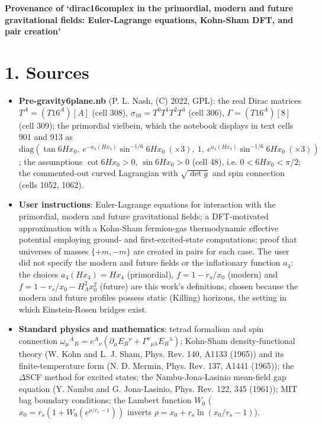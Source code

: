\documentclass[10pt]{article}
\begin{document}
{\raggedright\LARGE\bfseries Provenance of `dirac16complex in the primordial, modern and future gravitational fields: Euler-Lagrange equations, Kohn-Sham DFT, and pair creation'\par}\medskip

\section*{1. Sources}

\begin{itemize}
\item \textbf{Pre-gravity6plane.nb} (P. L. Nash, (C) 2022, GPL): the real Dirac matrices $T^A = (T16^A)[A]$ (cell 308), $\sigma_{16} = T^0T^1T^2T^3$ (cell 306), $\Gamma = (T16^A)[8]$ (cell 309); the primordial vielbein, which the notebook displays in text cells 901 and 913 as $\mathrm{diag}(\tan 6Hx_0,\ e^{-a_4(Hx_4)}\sin^{-1/6}6Hx_0\ (\times3),\ 1,\ e^{a_4(Hx_4)}\sin^{-1/6}6Hx_0\ (\times3))$; the assumptions $\cot 6Hx_0>0$, $\sin 6Hx_0>0$ (cell 48), i.e. $0 < 6Hx_0 < \pi/2$; the commented-out curved Lagrangian with $\sqrt{\det g}$ and spin connection (cells 1052, 1062).
\item \textbf{User instructions}: Euler-Lagrange equations for interaction with the primordial, modern and future gravitational fields; a DFT-motivated approximation with a Kohn-Sham fermion-gas thermodynamic effective potential employing ground- and first-excited-state computations; proof that universes of masses $\{+m,-m\}$ are created in pairs for each case. The user did not specify the modern and future fields or the inflationary function $a_4$: the choices $a_4(Hx_4) = Hx_4$ (primordial), $f = 1 - r_s/x_0$ (modern) and $f = 1 - r_s/x_0 - H_\Lambda^2x_0^2$ (future) are this work's definitions, chosen because the modern and future profiles possess static (Killing) horizons, the setting in which Einstein-Rosen bridges exist.
\item \textbf{Standard physics and mathematics}: tetrad formalism and spin connection $\omega_\mu{}^A{}_B = e^A{}_\nu(\partial_\mu E_B{}^\nu + \Gamma^\nu{}_{\mu\lambda}E_B{}^\lambda)$; Kohn-Sham density-functional theory (W. Kohn and L. J. Sham, Phys. Rev. 140, A1133 (1965)) and its finite-temperature form (N. D. Mermin, Phys. Rev. 137, A1441 (1965)); the $\Delta$SCF method for excited states; the Nambu-Jona-Lasinio mean-field gap equation (Y. Nambu and G. Jona-Lasinio, Phys. Rev. 122, 345 (1961)); MIT bag boundary conditions; the Lambert function $W_0$ ($x_0 = r_s(1 + W_0(e^{\rho/r_s-1}))$ inverts $\rho = x_0 + r_s\ln(x_0/r_s - 1)$).
\end{itemize}
\end{document}
